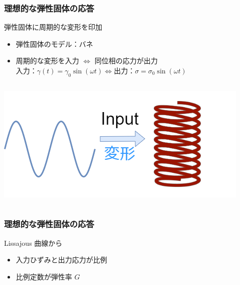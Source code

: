 \documentclass[unicode,12pt]{beamer}%
\begin{document}
\begin{frame}
    \frametitle{理想的な弾性固体の応答}
	\begin{block}{弾性固体に周期的な変形を印加}
		\begin{itemize}
			\item 弾性固体のモデル：バネ
			\item 周期的な変形を入力 $\Leftrightarrow$ 同位相の応力が出力\\
			$\text{入力：}\gamma (t) = \gamma_0 \sin(\omega t) \Leftrightarrow \text{出力：}\sigma = \sigma_0 \sin(\omega t)$
		\end{itemize}
	\end{block}
	\begin{columns}[c, onlytextwidth]
			\centering
				\includegraphics[width=\textwidth]{dynamic_Elast.png}
			
			\centering
	\end{columns}
\end{frame}

\begin{frame}
    \frametitle{理想的な弾性固体の応答}
	\begin{block}{Lissajous 曲線から}
		\begin{itemize}
			\item 入力ひずみと出力応力が比例
			\item 比例定数が弾性率 $G$ 
		\end{itemize}
	\end{block}

		\centering
\end{frame}
\end{document}

